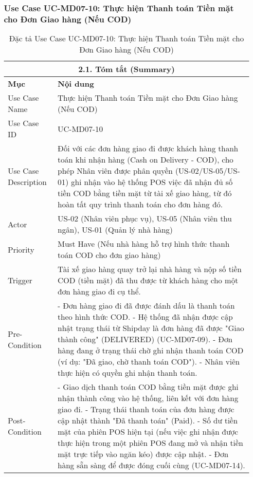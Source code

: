 \subsubsection{Use Case UC-MD07-10: Thực hiện Thanh toán Tiền mặt cho Đơn Giao hàng (Nếu COD)}
\begin{longtable}{|m{4cm}|p{11cm}|}
\caption{Đặc tả Use Case UC-MD07-10: Thực hiện Thanh toán Tiền mặt cho Đơn Giao hàng (Nếu COD)} \label{tab:uc_md07_10_final_full} \\
\hline
\multicolumn{2}{|c|}{\textbf{2.1. Tóm tắt (Summary)}} \\
\hline
\textbf{Mục} & \textbf{Nội dung} \\
\hline
\endhead %
\hline
\endfoot %
\hline
\endlastfoot %
Use Case Name & Thực hiện Thanh toán Tiền mặt cho Đơn Giao hàng (Nếu COD) \\
\hline
Use Case ID & UC-MD07-10 \\
\hline
Use Case Description & Đối với các đơn hàng giao đi được khách hàng thanh toán khi nhận hàng (Cash on Delivery - COD), cho phép Nhân viên được phân quyền (US-02/US-05/US-01) ghi nhận vào hệ thống POS việc đã nhận đủ số tiền COD bằng tiền mặt từ tài xế giao hàng, từ đó hoàn tất quy trình thanh toán cho đơn hàng đó. \\
\hline
Actor & US-02 (Nhân viên phục vụ), US-05 (Nhân viên thu ngân), US-01 (Quản lý nhà hàng) \\
\hline
Priority & Must Have (Nếu nhà hàng hỗ trợ hình thức thanh toán COD cho đơn giao hàng) \\
\hline
Trigger & Tài xế giao hàng quay trở lại nhà hàng và nộp số tiền COD (tiền mặt) đã thu được từ khách hàng cho một đơn hàng giao đi cụ thể. \\
\hline
Pre-Condition & - Đơn hàng giao đi đã được đánh dấu là thanh toán theo hình thức COD. \newline - Hệ thống đã nhận được cập nhật trạng thái từ Shipday là đơn hàng đã được "Giao thành công" (DELIVERED) (UC-MD07-09). \newline - Đơn hàng đang ở trạng thái chờ ghi nhận thanh toán COD (ví dụ: "Đã giao, chờ thanh toán COD"). \newline - Nhân viên thực hiện có quyền ghi nhận thanh toán. \\
\hline
Post-Condition & - Giao dịch thanh toán COD bằng tiền mặt được ghi nhận thành công vào hệ thống, liên kết với đơn hàng giao đi. \newline - Trạng thái thanh toán của đơn hàng được cập nhật thành "Đã thanh toán" (Paid). \newline - Số dư tiền mặt của phiên POS hiện tại (nếu việc ghi nhận được thực hiện trong một phiên POS đang mở và nhận tiền mặt trực tiếp vào ngăn kéo) được cập nhật. \newline - Đơn hàng sẵn sàng để được đóng cuối cùng (UC-MD07-14). \\

\end{longtable}
